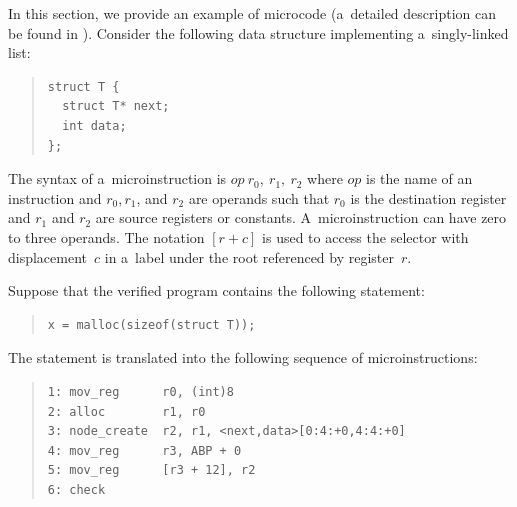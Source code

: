 {In this section, we provide an example of \forester microcode (a~detailed
description can be found in \cite{martin:dp}).
Consider the following data structure implementing a~singly-linked list:
%
\begin{quote}
\begin{verbatim}
struct T {
  struct T* next;
  int data;
};
\end{verbatim}
\end{quote}
%
The syntax of a~microinstruction is $\mathit{op}\ r_0,\ r_1,\ r_2$
where $\mathit{op}$ is the name of an instruction and
$r_0, r_1$, and $r_2$ are operands such that $r_0$ is the destination register and
$r_1$ and $r_2$ are source registers or constants.
A~microinstruction can have zero to three operands.
The notation $[r+c]$ is used to access the selector with displacement~$c$ in a~label
under the root referenced by register~$r$.
% 	

Suppose that the verified program contains the following statement:
%
\begin{quote}
\begin{verbatim}
x = malloc(sizeof(struct T));
\end{verbatim}
\end{quote}
%
The statement is translated into the following sequence of microinstructions:
%
\begin{quote}
\begin{verbatim}
1: mov_reg      r0, (int)8
2: alloc        r1, r0
3: node_create  r2, r1, <next,data>[0:4:+0,4:4:+0]
4: mov_reg      r3, ABP + 0
5: mov_reg      [r3 + 12], r2
6: check
\end{verbatim}
\end{quote}

}
